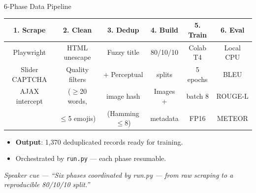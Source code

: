 \documentclass[10pt, aspectratio=169]{beamer}
\newcommand{\speakercue}[1]{%
  \vfill
  {\footnotesize\itshape\color{gray}Speaker cue --- #1}%
}
\begin{document}
\begin{frame}{6-Phase Data Pipeline}
  \begin{center}
  \begin{tabular}{|c|c|c|c|c|c|}
    \hline
    \textbf{1. Scrape}    & \textbf{2. Clean}      & \textbf{3. Dedup}    & \textbf{4. Build}    & \textbf{5. Train}      & \textbf{6. Eval}    \\
    \hline
    Playwright            & HTML unescape          & Fuzzy title          & 80/10/10             & Colab T4               & Local CPU           \\
    Slider CAPTCHA        & Quality filters        & + Perceptual         & splits               & 5 epochs               & BLEU                \\
    AJAX intercept        & ($\geq$20 words,       & image hash           & Images +             & batch 8                & ROUGE-L             \\
                          & $\leq$5 emojis)        & (Hamming $\leq$8)    & metadata             & FP16                   & METEOR              \\
    \hline
  \end{tabular}
  \end{center}
  \vspace{0.4cm}
  \begin{itemize}\itemsep2pt
    \item \textbf{Output}: 1{,}370 deduplicated records ready for training.
    \item Orchestrated by \texttt{run.py} --- each phase resumable.
  \end{itemize}
  \speakercue{``Six phases coordinated by run.py --- from raw scraping to a
  reproducible 80/10/10 split.''}
\end{frame}
\end{document}
